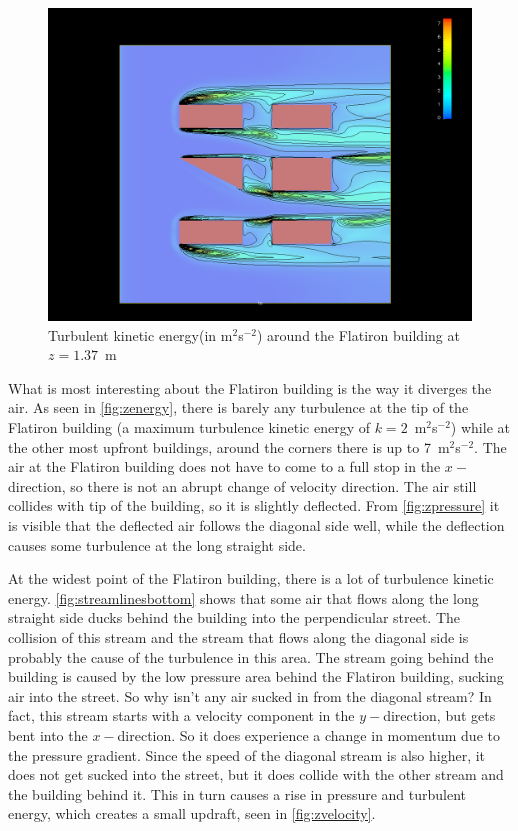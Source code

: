 \begin{figure}[htp]
\centering
\includegraphics[width = \textwidth]{zenergy.png}
\caption{Turbulent kinetic energy(in m$^2$s$^{-2}$) around the Flatiron building at $z=1.37$~m}
\label{fig:zenergy}
\end{figure}

What is most interesting about the Flatiron building is the way it diverges the air. As seen in \autoref{fig:zenergy}, there is barely any turbulence at the tip of the Flatiron building (a maximum turbulence kinetic energy of $k=2$~m$^2$s$^{-2}$) while at the other most upfront buildings, around the corners there is up to 7~m$^2$s$^{-2}$. The air at the Flatiron building does not have to come to a full stop in the $x-$direction, so there is not an abrupt change of velocity direction. The air still collides with tip of the building, so it is slightly deflected. From \autoref{fig:zpressure} it is visible that the deflected air follows the diagonal side well, while the deflection causes some turbulence at the long straight side. 

At the widest point of the Flatiron building, there is a lot of turbulence kinetic energy. \autoref{fig:streamlinesbottom} shows that some air that flows along the long straight side ducks behind the building into the perpendicular street. The collision of this stream and the stream that flows along the diagonal side is probably the cause of the turbulence in this area. The stream going behind the building is caused by the low pressure area behind the Flatiron building, sucking air into the street. So why isn't any air sucked in from the diagonal stream? In fact, this stream starts with a velocity component in the $y-$direction, but gets bent into the $x-$direction. So it does experience a change in momentum due to the pressure gradient. Since the speed of the diagonal stream is also higher, it does not get sucked into the street, but it does collide with the other stream and the building behind it. This in turn causes a rise in pressure and turbulent energy, which creates a small updraft, seen in \autoref{fig:zvelocity}. 


